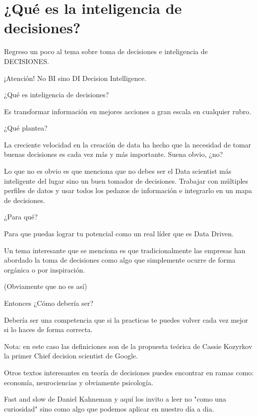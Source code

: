 \chapter{¿Qué es la inteligencia de decisiones?}
\label{Cap1}
Regreso un poco al tema sobre toma de decisiones e inteligencia de DECISIONES. 


¡Atención! No BI sino DI Decision Intelligence. 

¿Qué es inteligencia de decisiones? 

Es transformar información en mejores acciones a gran escala en cualquier rubro. 

¿Qué plantea? 

La creciente velocidad en la creación de data ha hecho que la necesidad de tomar buenas decisiones es cada vez más y más importante. Suena obvio, ¿no? 

Lo que no es obvio es que menciona que no debes ser el Data scientist más inteligente del lugar sino un buen tomador de decisiones. Trabajar con múltiples perfiles de datos y usar todos los pedazos de información e integrarlo en un mapa de decisiones. 

¿Para qué?

Para que puedas lograr tu potencial como un real líder que es Data Driven. 

Un tema interesante que se menciona es que tradicionalmente las empresas han abordado la toma de decisiones como algo que simplemente ocurre de forma orgánica o por inspiración. 

(Obviamente que no es así)

Entonces ¿Cómo debería ser?

Debería ser una competencia que si la practicas te puedes volver cada vez mejor si lo haces de forma correcta. 

Nota: en este caso las definiciones son de la propuesta teórica de Cassie Kozyrkov la primer Chief decision scientist de Google. 


Otros textos interesantes en teoría de decisiones puedes encontrar en ramas como: economía, neurociencias y obviamente psicología. 

Fast and slow de Daniel Kahneman y aquí los invito a leer no "como una curiosidad" sino como algo que podemos aplicar en  nuestro día a dia. 


